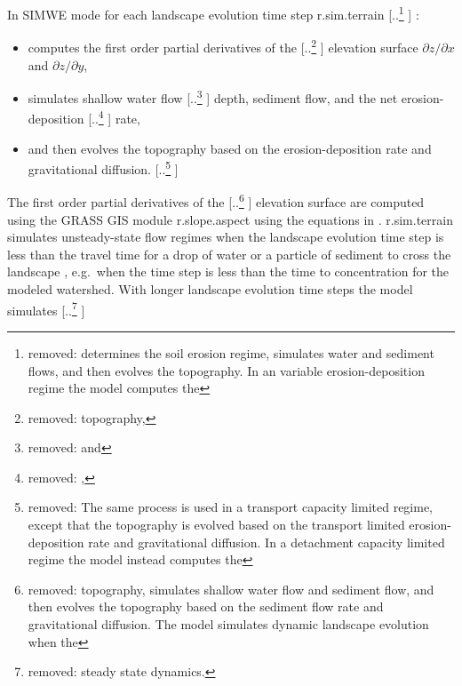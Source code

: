 \documentclass[gmd, manuscript]{copernicus}
\providecommand{\DIFadd}[1]{{\protect\color{blue} \sf #1}} %
\providecommand{\DIFdel}[1]{{\protect\color{red} [..\footnote{removed: #1} ]}} %
\providecommand{\DIFaddbegin}{} %
\providecommand{\DIFaddend}{} %
\providecommand{\DIFdelbegin}{} %
\providecommand{\DIFdelend}{} %
\begin{document}
\DIFdelend %
In SIMWE mode for each \DIFaddbegin \DIFadd{landscape evolution }\DIFaddend time step
r.sim.terrain\DIFdelbegin \DIFdel{determines the soil erosion regime,
simulates water and sediment flows, 
and then evolves the topography. 
In an variable erosion-deposition regime 
the model 
computes the }\DIFdelend \DIFaddbegin \DIFadd{:
} \begin{itemize} 
\item \DIFadd{computes the first order }\DIFaddend partial derivatives of the \DIFdelbegin \DIFdel{topography,
}\DIFdelend \DIFaddbegin \DIFadd{elevation surface
$\partial z / \partial x$ and $\partial z / \partial y$,
}\item \DIFaddend simulates shallow water flow \DIFdelbegin \DIFdel{and }\DIFdelend \DIFaddbegin \DIFadd{depth, sediment flow, and the net }\DIFaddend erosion-deposition \DIFdelbegin \DIFdel{,
}\DIFdelend \DIFaddbegin \DIFadd{rate, 
}\item \DIFaddend and then evolves the topography based on the erosion-deposition rate and gravitational diffusion. 
\DIFdelbegin \DIFdel{The same process is used in
a transport capacity limited regime,
except that the topography is evolved based on 
the transport limited erosion-deposition rate
and gravitational diffusion.
In a detachment capacity limited regime
the model instead
computes the }\DIFdelend \DIFaddbegin  \end{itemize} 
\DIFadd{The first order }\DIFaddend partial derivatives of the \DIFdelbegin \DIFdel{topography,
simulates shallow water flow and sediment flow,
and then evolves the topography based on the sediment flow rate
and gravitational diffusion.
The model simulates dynamic landscape evolution 
when the }\DIFdelend \DIFaddbegin \DIFadd{elevation surface
are computed using the GRASS GIS module r.slope.aspect 
using the equations in \cite{Hofierka2009}.
r.sim.terrain simulates unsteady-state flow regimes
when the landscape evolution }\DIFaddend time step is less than the travel time 
for a drop of water or a particle of sediment to cross the landscape\DIFaddbegin \DIFadd{,
e.g.~when the time step is less than the 
time to concentration for the modeled watershed}\DIFaddend .
With longer \DIFaddbegin \DIFadd{landscape evolution }\DIFaddend time steps 
the model simulates \DIFdelbegin \DIFdel{steady state dynamics. 
}%
\end{document}
